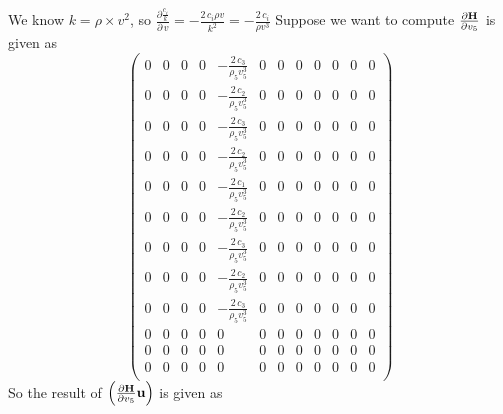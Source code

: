 \documentclass[revised,endfloat]{geophysics}
\begin{document}
We know $k = \rho \times v^2$, so $\frac{\partial \frac{c_i}{k}}{\partial\, v} = -\frac{2\, c_i \rho v}{k^2} =  -\frac{2\, c_i}{\rho v^3}$
Suppose we want to compute $\frac{\partial {\bf H}}{\partial v_5}$ is given as
\begin{equation}
\begin{pmatrix}
0 & 0 & 0 & 0 & -\frac{2\, c_3}{\rho_5 v_5^3} & 0 & 0 & 0 & 0 & 0 & 0 & 0 \\
0 & 0 & 0 & 0 & -\frac{2\, c_2}{\rho_5 v_5^3} & 0 & 0 & 0 & 0 & 0 & 0 & 0 \\
0 & 0 & 0 & 0 & -\frac{2\, c_3}{\rho_5 v_5^3} & 0 & 0 & 0 & 0 & 0 & 0 & 0 \\
0 & 0 & 0 & 0 & -\frac{2\, c_2}{\rho_5 v_5^3} & 0 & 0 & 0 & 0 & 0 & 0 & 0 \\
0 & 0 & 0 & 0 & -\frac{2\, c_1}{\rho_5 v_5^3} & 0 & 0 & 0 & 0 & 0 & 0 & 0 \\
0 & 0 & 0 & 0 & -\frac{2\, c_2}{\rho_5 v_5^3} & 0 & 0 & 0 & 0 & 0 & 0 & 0 \\
0 & 0 & 0 & 0 & -\frac{2\, c_3}{\rho_5 v_5^3} & 0 & 0 & 0 & 0 & 0 & 0 & 0 \\
0 & 0 & 0 & 0 & -\frac{2\, c_2}{\rho_5 v_5^3} & 0 & 0 & 0 & 0 & 0 & 0 & 0 \\
0 & 0 & 0 & 0 & -\frac{2\, c_3}{\rho_5 v_5^3} & 0 & 0 & 0 & 0 & 0 & 0 & 0 \\
0 & 0 & 0 & 0 & 0 & 0 & 0 & 0 & 0 & 0 & 0 & 0 \\
0 & 0 & 0 & 0 & 0 & 0 & 0 & 0 & 0 & 0 & 0 & 0 \\
0 & 0 & 0 & 0 & 0 & 0 & 0 & 0 & 0 & 0 & 0 & 0 \\
\end{pmatrix}
\end{equation}
So the result of $\left( \frac{\partial {\bf H}}{\partial v_5} {\bf u} \right)$ is given as
\end{document}

